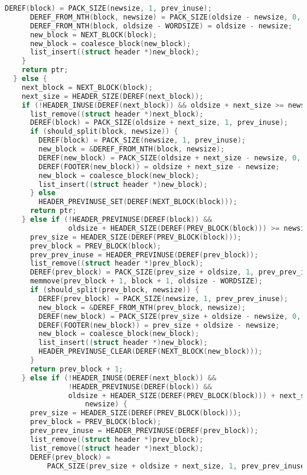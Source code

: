 \documentclass{scrartcl}
\begin{document}
\begin{lstlisting}[language=C]
      DEREF(block) = PACK_SIZE(newsize, 1, prev_inuse);
      DEREF_FROM_NTH(block, newsize) = PACK_SIZE(oldsize - newsize, 0, 1);
      DEREF_FROM_NTH(block, oldsize - WORDSIZE) = oldsize - newsize;
      new_block = NEXT_BLOCK(block);
      new_block = coalesce_block(new_block);
      list_insert((struct header *)new_block);
    }
    return ptr;
  } else {
    next_block = NEXT_BLOCK(block);
    next_size = HEADER_SIZE(DEREF(next_block));
    if (!HEADER_INUSE(DEREF(next_block)) && oldsize + next_size >= newsize) {
      list_remove((struct header *)next_block);
      DEREF(block) = PACK_SIZE(oldsize + next_size, 1, prev_inuse);
      if (should_split(block, newsize)) {
        DEREF(block) = PACK_SIZE(newsize, 1, prev_inuse);
        new_block = &DEREF_FROM_NTH(block, newsize);
        DEREF(new_block) = PACK_SIZE(oldsize + next_size - newsize, 0, 1);
        DEREF(FOOTER(new_block)) = oldsize + next_size - newsize;
        new_block = coalesce_block(new_block);
        list_insert((struct header *)new_block);
      } else
        HEADER_PREVINUSE_SET(DEREF(NEXT_BLOCK(block)));
      return ptr;
    } else if (!HEADER_PREVINUSE(DEREF(block)) &&
               oldsize + HEADER_SIZE(DEREF(PREV_BLOCK(block))) >= newsize) {
      prev_size = HEADER_SIZE(DEREF(PREV_BLOCK(block)));
      prev_block = PREV_BLOCK(block);
      prev_prev_inuse = HEADER_PREVINUSE(DEREF(prev_block));
      list_remove((struct header *)prev_block);
      DEREF(prev_block) = PACK_SIZE(prev_size + oldsize, 1, prev_prev_inuse);
      memmove(prev_block + 1, block + 1, oldsize - WORDSIZE);
      if (should_split(prev_block, newsize)) {
        DEREF(prev_block) = PACK_SIZE(newsize, 1, prev_prev_inuse);
        new_block = &DEREF_FROM_NTH(prev_block, newsize);
        DEREF(new_block) = PACK_SIZE(prev_size + oldsize - newsize, 0, 1);
        DEREF(FOOTER(new_block)) = prev_size + oldsize - newsize;
        new_block = coalesce_block(new_block);
        list_insert((struct header *)new_block);
        HEADER_PREVINUSE_CLEAR(DEREF(NEXT_BLOCK(new_block)));
      }
      return prev_block + 1;
    } else if (!HEADER_INUSE(DEREF(next_block)) &&
               !HEADER_PREVINUSE(DEREF(block)) &&
               oldsize + HEADER_SIZE(DEREF(PREV_BLOCK(block))) + next_size >=
                   newsize) {
      prev_size = HEADER_SIZE(DEREF(PREV_BLOCK(block)));
      prev_block = PREV_BLOCK(block);
      prev_prev_inuse = HEADER_PREVINUSE(DEREF(prev_block));
      list_remove((struct header *)prev_block);
      list_remove((struct header *)next_block);
      DEREF(prev_block) =
          PACK_SIZE(prev_size + oldsize + next_size, 1, prev_prev_inuse);

\end{lstlisting}
\end{document}
